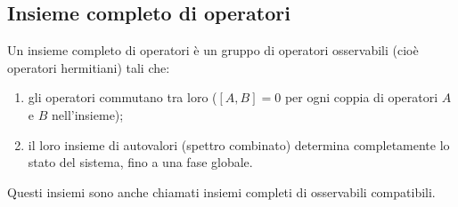 \subsection{Insieme completo di operatori}
Un insieme completo di operatori è un gruppo di operatori osservabili (cioè
operatori hermitiani) tali che:
\begin{enumerate}
  \item gli operatori commutano tra loro (\( [A, B] = 0 \) per ogni coppia di
    operatori \( A \) e \( B \) nell'insieme);
  \item il loro insieme di autovalori (spettro combinato) determina
    completamente lo stato del sistema, fino a una fase globale.
\end{enumerate}
Questi insiemi sono anche chiamati insiemi completi di osservabili compatibili.